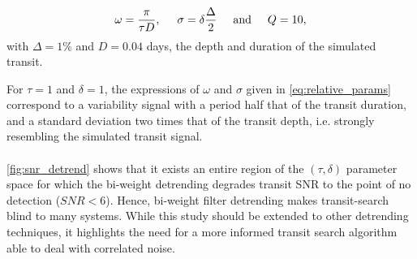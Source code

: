\documentclass[modern]{aastex631}
\begin{document}
\begin{equation}\label{eq:relative_params}
    \omega = \frac{\pi}{\tau D}, \hspace{0.5cm} 
    \sigma = \delta \frac{\Delta}{2} \hspace{0.5cm}  \text{and}  \hspace{0.5cm}  
    Q = 10,
\end{equation}
with $\Delta=1\%$ and $D=0.04$ days, the depth and duration of the simulated transit. 

For $\tau=1$ and $\delta=1$, the expressions of $\omega$ and $\sigma$ given in \autoref{eq:relative_params} correspond to a variability signal with a period half that of the transit duration, and a standard deviation two times that of the transit depth, i.e. strongly resembling the simulated transit signal.\\\\
\autoref{fig:snr_detrend} shows that it exists an entire region of the $(\tau, \delta)$ parameter space for which the bi-weight detrending degrades transit SNR to the point of no detection ($SNR < 6$). Hence, bi-weight filter detrending makes transit-search blind to many systems. While this study should be extended to other detrending techniques, it highlights the need for a more informed transit search algorithm able to deal with correlated noise.
\end{document}
